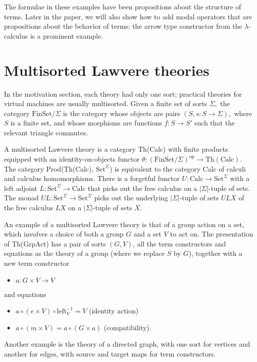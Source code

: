 \documentclass{llncs}
\newcommand{\maps}{\colon}
\newcommand{\FinSet}{\mathrm{FinSet}}
\newcommand{\Set}{\mathrm{Set}}
\newcommand{\Calc}{\mathrm{Calc}}
\newcommand{\leftu}{\mathrm{left}}
\newcommand{\op}{\mathrm{op}}
\begin{document}
The formulae in these examples have been propositions about the structure of terms.  Later in the paper, we will also show how to add modal operators that are propositions about the behavior of terms; the arrow type constructor from the $\lambda$-calculus is a prominent example.

\section{Multisorted Lawvere theories}
In the motivation section, each theory had only one sort; practical theories for virtual machines are usually multisorted.  Given a finite set of sorts $\Sigma,$ the category $\FinSet/\Sigma$ is the category whose objects are pairs $(S, s\maps S\to \Sigma),$ where $S$ is a finite set, and whose morphisms are functions $f\maps S \to S'$ such that the relevant triangle commutes.

A multisorted Lawvere theory is a category Th(Calc) with finite products equipped with an identity-on-objects functor ${\theta\maps (\FinSet/\Sigma)^\op \to \mathrm{Th(Calc)}.}$  The category Prod(Th(Calc), $\Set^\Sigma$) is equivalent to the category Calc of calculi and calculus homomorphisms.  There is a forgetful functor ${U\maps \Calc \to \Set^\Sigma}$ with a left adjoint ${L\maps \Set^\Sigma \to \Calc}$ that picks out the free calculus on a $|\Sigma|$-tuple of sets.  The monad ${UL\maps \Set^\Sigma \to \Set^\Sigma}$ picks out the underlying $|\Sigma|$-tuple of sets $ULX$ of the free calculus $LX$ on a $|\Sigma|$-tuple of sets $X$.

An example of a multisorted Lawvere theory is that of a group action on a set, which involves a choice of both a group $G$ and a set $V$ to act on.  The presentation of Th(GrpAct) has a pair of sorts $(G, V)$, all the term constructors and equations as the theory of a group (where we replace $S$ by $G$), together with a new term constructor
\begin{itemize}
  \item $a\maps G \times V \to V$
\end{itemize}
and equations
\begin{itemize}
  \item $a \circ (e \times V) \circ \leftu^{-1}_V = V$ (identity action)
  \item $a \circ (m \times V) = a \circ (G \times a)$ (compatibility).
\end{itemize}

Another example is the theory of a directed graph, with one sort for vertices and another for edges, with source and target maps for term constructors.
\end{document}
